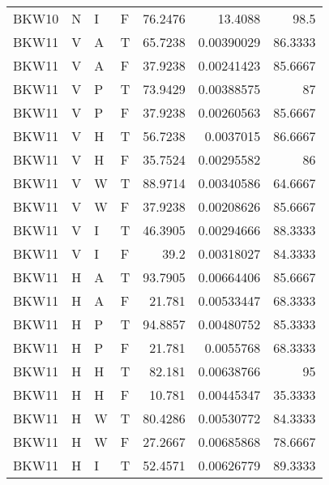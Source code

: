 \begin{longtable}{llllrrr}
    BKW10    & N         & I         & F          & 76.2476    & 13.4088     & 98.5     \\
    BKW11    & V         & A         & T          & 65.7238    & 0.00390029  & 86.3333  \\
    BKW11    & V         & A         & F          & 37.9238    & 0.00241423  & 85.6667  \\
    BKW11    & V         & P         & T          & 73.9429    & 0.00388575  & 87       \\
    BKW11    & V         & P         & F          & 37.9238    & 0.00260563  & 85.6667  \\
    BKW11    & V         & H         & T          & 56.7238    & 0.0037015   & 86.6667  \\
    BKW11    & V         & H         & F          & 35.7524    & 0.00295582  & 86       \\
    BKW11    & V         & W         & T          & 88.9714    & 0.00340586  & 64.6667  \\
    BKW11    & V         & W         & F          & 37.9238    & 0.00208626  & 85.6667  \\
    BKW11    & V         & I         & T          & 46.3905    & 0.00294666  & 88.3333  \\
    BKW11    & V         & I         & F          & 39.2       & 0.00318027  & 84.3333  \\
    BKW11    & H         & A         & T          & 93.7905    & 0.00664406  & 85.6667  \\
    BKW11    & H         & A         & F          & 21.781     & 0.00533447  & 68.3333  \\
    BKW11    & H         & P         & T          & 94.8857    & 0.00480752  & 85.3333  \\
    BKW11    & H         & P         & F          & 21.781     & 0.0055768   & 68.3333  \\
    BKW11    & H         & H         & T          & 82.181     & 0.00638766  & 95       \\
    BKW11    & H         & H         & F          & 10.781     & 0.00445347  & 35.3333  \\
    BKW11    & H         & W         & T          & 80.4286    & 0.00530772  & 84.3333  \\
    BKW11    & H         & W         & F          & 27.2667    & 0.00685868  & 78.6667  \\
    BKW11    & H         & I         & T          & 52.4571    & 0.00626779  & 89.3333  \\

\end{longtable}

